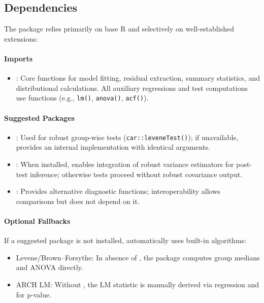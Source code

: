 \subsection{Dependencies}\label{sec:dependencies}
The  package relies primarily on base R and selectively on well-established extensions:

\paragraph{Imports}
\begin{itemize}
  \item {}: Core functions for model fitting, residual extraction,
        summary statistics, and distributional calculations. All auxiliary
        regressions and test computations use  functions
        (e.g., \texttt{lm()}, \texttt{anova()}, \texttt{acf()}).
\end{itemize}

\paragraph{Suggested Packages}
\begin{itemize}
  \item {}: Used for robust group-wise tests
        (\texttt{car::leveneTest()}); if unavailable, 
        provides an internal implementation with identical arguments.
  \item {}: When installed, enables integration of robust
        variance estimators for post-test inference; otherwise tests proceed
        without robust covariance output.
  \item {}: Provides alternative diagnostic functions;
         interoperability allows comparisons but does not
        depend on it.
\end{itemize}

\paragraph{Optional Fallbacks}
If a suggested package is not installed,  automatically uses built-in algorithms:
\begin{itemize}
  \item Levene/Brown–Forsythe: In absence of , the package
        computes group medians and ANOVA directly.
  \item ARCH LM: Without , the LM statistic is manually
        derived via regression and  for p-value.
\end{itemize}

